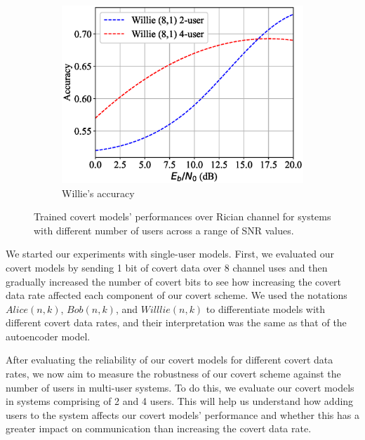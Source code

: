 \begin{figure}[tp!]
\begin{subfigure}{0.28\textwidth}
		\includegraphics[width=\linewidth]{figs/multi_willie_accuracy_rician}
		\caption{Willie's accuracy}
		\label{fig:multi_rician_results_willie}
	\end{subfigure}
	\caption{Trained covert models' performances over Rician channel for systems with different number of users across a range of SNR values.}
	\label{fig:multi_rician_results}
\end{figure}

We started our experiments with single-user models. First, we evaluated our covert models by sending 1 bit of covert data over 8 channel uses and then gradually increased the number of covert bits to see how increasing the covert data rate affected each component of our covert scheme. We used the notations \(Alice (n,k)\), \(Bob (n,k)\), and \(Willlie (n,k)\) to differentiate models with different covert data rates, and their interpretation was the same as that of the autoencoder model.

After evaluating the reliability of our covert models for different covert data rates, we now aim to measure the robustness of our covert scheme against the number of users in multi-user systems. To do this, we evaluate our covert models in systems comprising of 2 and 4 users. This will help us understand how adding users to the system affects our covert models' performance and whether this has a greater impact on communication than increasing the covert data rate.

